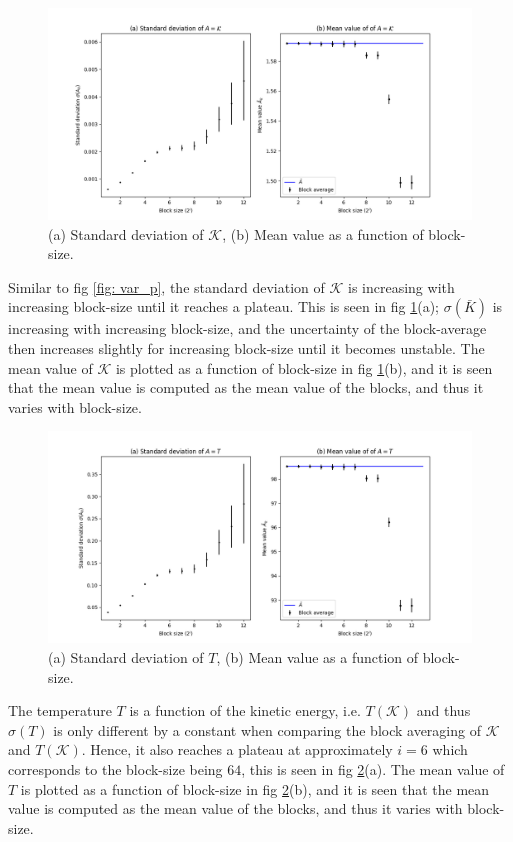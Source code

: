 \documentclass[a4paper]{article}
\begin{document}
\begin{figure}[H]
    \centering
    \includegraphics[scale = 0.45]{var_k.png}
    \caption{(a) Standard deviation of $\mathcal{K}$, (b) Mean value as a function of block-size.}
    \label{fig: var_k}
\end{figure}\noindent
Similar to fig \ref{fig: var_p}, the standard deviation of $\mathcal{K}$ is increasing with increasing block-size until it reaches a plateau.
This is seen in fig \ref{fig: var_k}(a); $\sigma(\bar{K})$ is increasing with increasing block-size, and the uncertainty of the block-average then increases slightly for increasing block-size until it becomes unstable.
The mean value of $\mathcal{K}$ is plotted as a function of block-size in fig \ref{fig: var_k}(b), and it is seen that the mean value is computed as the mean value of the blocks, and thus it varies with block-size.

\begin{figure}[H]
    \centering
    \includegraphics[scale = 0.45]{var_t.png}
    \caption{(a) Standard deviation of $T$, (b) Mean value as a function of block-size.}
    \label{fig: var_t}
\end{figure}\noindent
The temperature $T$ is a function of the kinetic energy, i.e. $T(\mathcal{K})$ and thus $\sigma(T)$ is only different by a constant when comparing the block averaging of $\mathcal{K}$ and $T(\mathcal{K})$.
Hence, it also reaches a plateau at approximately $i = 6$ which corresponds to the block-size being $64$, this is seen in fig \ref{fig: var_t}(a).
The mean value of $T$ is plotted as a function of block-size in fig \ref{fig: var_t}(b), and it is seen that the mean value is computed as the mean value of the blocks, and thus it varies with block-size.
\end{document}
